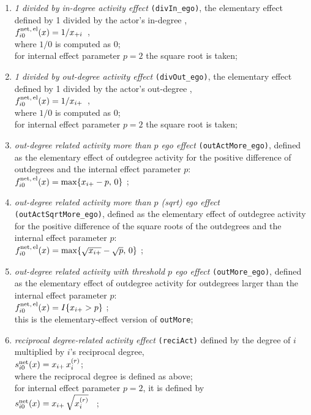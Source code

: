 \documentclass[a4paper,fleqn,11pt]{article}
\newcommand{\+}{\, + \,}
\newcommand{\vit}{\theenumi}
\begin{document}
\begin{enumerate}
 \item {\em 1 divided by in-degree activity effect} \texttt{(divIn\_ego)},
 the elementary effect defined by 1 divided by the actor's in-degree ,\\
 $ f^{\rm net,\, el}_{i\vit}(x)  =  1/ x_{+i}\,$ ,\\
 where $1/0$ is computed as 0;\\
  for internal effect parameter $p=2$ the square root is taken;

 \item {\em 1 divided by out-degree activity effect} \texttt{(divOut\_ego)},
 the elementary effect defined by 1 divided by the actor's out-degree ,\\
 $ f^{\rm net,\, el}_{i\vit}(x)  =  1/ x_{i+}\,$ ,\\
 where $1/0$ is computed as 0;\\
 for internal effect parameter $p=2$ the square root is taken;

 \item {\em out-degree related activity more than $p$ ego effect} \texttt{(outActMore\_ego)},
 	 defined as the elementary effect of outdegree activity
 for the positive difference of outdegrees and the internal effect parameter $p$:\\
 $ f^{\rm net,\, el}_{i\vit}(x)  =  \max \{  x_{i+} - p, \, 0 \} $ ;\\

 \item {\em out-degree related activity more than $p$ (sqrt) ego effect} \texttt{(outActSqrtMore\_ego)},
 	 defined as the elementary effect of outdegree activity
 for the positive difference of the square roots of the outdegrees and the internal effect parameter $p$:\\
 $ f^{\rm net,\, el}_{i\vit}(x)  =  \max \{  \sqrt{x_{i+}} -\sqrt{p} ,\, 0 \} $ ;\\

 \item {\em out-degree related activity with threshold $p$ ego effect} \texttt{(outMore\_ego)},
 	 defined as the elementary effect of outdegree activity
 for  outdegrees larger than the internal effect parameter $p$:\\
 $ f^{\rm net,\, el}_{i\vit}(x)  =  I \{  x_{i+} > p \} $ ;\\
 this is the elementary-effect version of \texttt{outMore};

 \item {\em reciprocal degree-related activity effect} \texttt{(reciAct)}
 defined by the degree of $i$ multiplied by $i$'s reciprocal degree,\\
 $s^{\rm net}_{i\vit}(x) =   x_{i+}\, x^{(r)}_{i} $; \\
 where the reciprocal degree is defined as above;\\
 for internal effect parameter $p=2$, it is defined by\\
 $s^{\rm net}_{i\vit}(x) =   x_{i+}\, \sqrt{x^{(r)}_{i}} $ \ ; \\


\end{enumerate}
\end{document}
